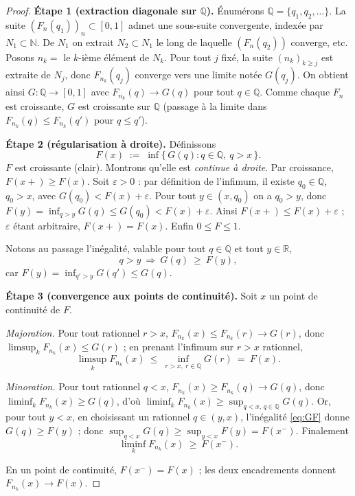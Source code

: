 \documentclass[11pt]{article}
\newcommand{\R}{\mathbb{R}}
\newcommand{\Q}{\mathbb{Q}}
\theoremstyle{plain}
\theoremstyle{definition}
\theoremstyle{remark}
\begin{document}
\begin{proof}
\textbf{Étape 1 (extraction diagonale sur $\Q$).}
Énumérons $\Q=\{q_1,q_2,\dots\}$. La suite $(F_n(q_1))_n\subset[0,1]$ admet une sous-suite convergente,
indexée par $N_1\subset\mathbb N$. De $N_1$ on extrait $N_2\subset N_1$ le long de laquelle
$(F_n(q_2))$ converge, etc. Posons $n_k=$ le $k$-ième élément de $N_k$. Pour tout $j$ fixé, la suite
$(n_k)_{k\ge j}$ est extraite de $N_j$, donc $F_{n_k}(q_j)$ converge vers une limite notée $G(q_j)$.
On obtient ainsi $G:\Q\to[0,1]$ avec $F_{n_k}(q)\to G(q)$ pour tout $q\in\Q$. Comme chaque $F_n$ est
croissante, $G$ est croissante sur $\Q$ (passage à la limite dans $F_{n_k}(q)\le F_{n_k}(q')$ pour
$q\le q'$).

\smallskip
\textbf{Étape 2 (régularisation à droite).} Définissons
\[
F(x)\;:=\;\inf\{\,G(q):q\in\Q,\ q>x\,\}.
\]
$F$ est croissante (clair). Montrons qu'elle est \emph{continue à droite}. Par croissance,
$F(x+)\ge F(x)$. Soit $\varepsilon>0$ : par définition de l'infimum, il existe $q_0\in\Q$, $q_0>x$,
avec $G(q_0)<F(x)+\varepsilon$. Pour tout $y\in(x,q_0)$ on a $q_0>y$, donc
$F(y)=\inf_{q>y}G(q)\le G(q_0)<F(x)+\varepsilon$. Ainsi $F(x+)\le F(x)+\varepsilon$ ; $\varepsilon$
étant arbitraire, $F(x+)=F(x)$. Enfin $0\le F\le1$.

Notons au passage l'inégalité, valable pour tout $q\in\Q$ et tout $y\in\R$,
\begin{equation}\label{eq:GF}
q>y\ \Longrightarrow\ G(q)\ \ge\ F(y),
\end{equation}
car $F(y)=\inf_{q'>y}G(q')\le G(q)$.

\smallskip
\textbf{Étape 3 (convergence aux points de continuité).}
Soit $x$ un point de continuité de $F$.

\emph{Majoration.} Pour tout rationnel $r>x$, $F_{n_k}(x)\le F_{n_k}(r)\to G(r)$, donc
$\limsup_k F_{n_k}(x)\le G(r)$ ; en prenant l'infimum sur $r>x$ rationnel,
\[
\limsup_k F_{n_k}(x)\ \le\ \inf_{r>x,\ r\in\Q}G(r)\ =\ F(x).
\]

\emph{Minoration.} Pour tout rationnel $q<x$, $F_{n_k}(x)\ge F_{n_k}(q)\to G(q)$, donc
$\liminf_k F_{n_k}(x)\ge G(q)$, d'où $\liminf_k F_{n_k}(x)\ge\sup_{q<x,\,q\in\Q}G(q)$.
Or, pour tout $y<x$, en choisissant un rationnel $q\in(y,x)$, l'inégalité \eqref{eq:GF} donne
$G(q)\ge F(y)$ ; donc $\sup_{q<x}G(q)\ge\sup_{y<x}F(y)=F(x^-)$. Finalement
\[
\liminf_k F_{n_k}(x)\ \ge\ F(x^-).
\]

En un point de continuité, $F(x^-)=F(x)$ ; les deux encadrements donnent
$F_{n_k}(x)\to F(x)$.
\end{proof}
\end{document}
